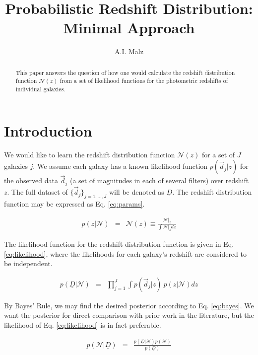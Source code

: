 \documentclass[12pt, onecolumn]{emulateapj}
\newcommand{\textul}{\underline}
\begin{document}
\title{Probabilistic Redshift Distribution: Minimal Approach}

\author{A.I. Malz}

\begin{abstract}
This paper answers the question of how one would calculate the redshift distribution function $\mathcal{N}(z)$ from a set of likelihood functions for the photometric redshifts of individual galaxies.
\end{abstract}


\section{Introduction}

We would like to learn the redshift distribution function $\mathcal{N}(z)$ for a set of $J$ galaxies $j$.  We assume each galaxy has a known likelihood function $p(\vec{d}_{j}|z)$ for the observed data $\vec{d}_{j}$ (a set of magnitudes in each of several filters) over redshift $z$.  The full dataset of $\{\vec{d}_{j}\}_{j=1,\dots,J}$ will be denoted as $\textul{D}$.  The redshift distribution function may be expressed as Eq. \ref{eq:params}.

\begin{eqnarray}
\label{eq:params}
p(z|\mathcal{N}) &=& \mathcal{N}(z) \equiv \frac{\mathcal{N}|_{z}}{\int\mathcal{N}|_{z}dz}
\end{eqnarray}

The likelihood function for the redshift distribution function is given in Eq. \ref{eq:likelihood}, where the likelihoods for each galaxy's redshift are considered to be independent.  

\begin{eqnarray}
\label{eq:likelihood}
p(\textul{D}|\mathcal{N}) &=& \prod_{j=1}^{J}\int p(\vec{d}_{j}|z)\ p(z|\mathcal{N})dz
\end{eqnarray}

By Bayes' Rule, we may find the desired posterior according to Eq. \ref{eq:bayes}.  We want the posterior for direct comparison with prior work in the literature, but the likelihood of Eq. \ref{eq:likelihood} is in fact preferable.

\begin{eqnarray}
\label{eq:bayes}
p(\mathcal{N}|\textul{D}) &=& \frac{p(\textul{D}|\mathcal{N})p(\mathcal{N})}{p(\textul{D})}
\end{eqnarray}
\end{document}
